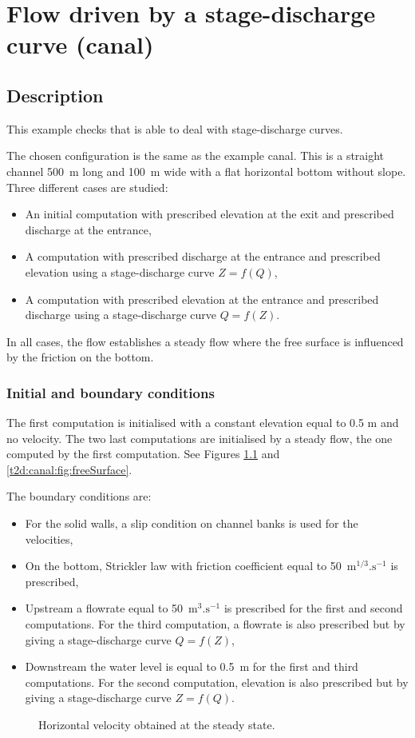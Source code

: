 \chapter{Flow driven by a stage-discharge curve (canal)}

\section{Description}

This example checks that  is able to deal with stage-discharge
curves.

The chosen configuration is the same as the  example canal.
This is a straight channel 500~m long and 100~m wide
with a flat horizontal bottom without slope.
Three different cases are studied:
\begin{itemize}
\item An initial computation with prescribed elevation at the exit and
prescribed discharge at the entrance,
\item A computation with prescribed discharge at the entrance and prescribed
elevation using a stage-discharge curve $Z = f(Q)$,
\item A computation with prescribed elevation at the entrance and prescribed
discharge using a stage-discharge curve $Q = f(Z)$.
\end{itemize}
In all cases, the flow establishes a steady flow where the free surface
is influenced by the friction on the bottom.

\subsection{Initial and boundary conditions}

The first computation is initialised with a constant elevation equal to
0.5 m and no velocity.
The two last computations are initialised by a steady flow, the one computed
by the first computation.
See Figures 
\ref{t2d:canal:fig:veloH} and \ref{t2d:canal:fig:freeSurface}.

The boundary conditions are:
\begin{itemize}
\item For the solid walls, a slip condition on channel banks is used for the
velocities,
\item On the bottom, Strickler law with friction coefficient equal to
50~$\text{m}^{1/3}.\text{s}^{-1}$ is prescribed,
\item Upstream a flowrate equal to 50~$\text{m}^{3}.\text{s}^{-1}$ is prescribed
for the first and second computations.
For the third computation, a flowrate is also prescribed but by giving a
stage-discharge curve $Q = f(Z)$,
\item Downstream the water level is equal to 0.5~m for the first and third
computations.
For the second computation, elevation is also prescribed but by giving a
stage-discharge curve $Z = f(Q)$.
\end{itemize}
\begin{figure}[!htbp]
 \centering
 \caption{Horizontal velocity obtained at the steady state.}
 \label{t2d:canal:fig:veloH}
\end{figure}

